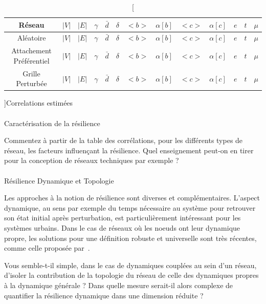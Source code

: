 \begin{table}
\begin{tabular}{c|c|c|c|c|c|c|c|c|c|c|c|c}
\hline
Réseau & $\left|V\right|$ & $\left|E\right|$ & $\gamma$ & $\bar{d}$ & $\delta$ & $<b>$ & $\alpha \left[b\right]$ & $<c>$ & $\alpha\left[c\right]$ & $e$ & $t$ & $\mu$\\\hline
Aléatoire & $\left|V\right|$ & $\left|E\right|$ & $\gamma$ & $\bar{d}$ & $\delta$ & $<b>$ & $\alpha \left[b\right]$ & $<c>$ & $\alpha\left[c\right]$ & $e$ & $t$ & $\mu$\\\hline
Attachement Préférentiel & $\left|V\right|$ & $\left|E\right|$ & $\gamma$ & $\bar{d}$ & $\delta$ & $<b>$ & $\alpha \left[b\right]$ & $<c>$ & $\alpha\left[c\right]$ & $e$ & $t$ & $\mu$\\\hline
Grille Perturbée & $\left|V\right|$ & $\left|E\right|$ & $\gamma$ & $\bar{d}$ & $\delta$ & $<b>$ & $\alpha \left[b\right]$ & $<c>$ & $\alpha\left[c\right]$ & $e$ & $t$ & $\mu$\\\hline
\end{tabular}
\caption[][]{}{Correlations estimées \label{tab:corr}}
\end{table}



\paragraph{}{Caractérisation de la résilience}

Commentez à partir de la table des corrélations, pour les différents types de réseau, les facteurs influençant la résilience. Quel enseignement peut-on en tirer pour la conception de réseaux techniques par exemple ?



\paragraph{}{Résilience Dynamique et Topologie}

Les approches à la notion de résilience sont diverses et complémentaires. L'aspect dynamique, au sens par exemple du temps nécessaire au système pour retrouver son état initial après perturbation, est particulièrement intéressant pour les systèmes urbains. Dans le cas de réseaux où les noeuds ont leur dynamique propre, les solutions pour une définition robuste et universelle sont très récentes, comme celle proposée par~\cite{Gao:2016ty}.


Vous semble-t-il simple, dans le cas de dynamiques couplées au sein d'un réseau, d'isoler la contribution de la topologie du réseau de celle des dynamiques propres à la dynamique générale ? Dans quelle mesure serait-il alors complexe de quantifier la résilience dynamique dans une dimension réduite ?








